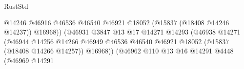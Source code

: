 \begin{lexlean}{RustStd}
\begin{coremodule}
{\begin{coremodule}
{{{{{{{{{{{{{{{{{{{{{{{{{{{{{{{{{{{{{{{{{{{{{{{{{{{{{{{{{{{{                                                                    @14246
                                                                    @46916
                                                                    @46536
                                                                    @46540
                                                                    @46921
                                                                    @18052
                                                                    (@15837 (@18408 @14246 @14237))
                                                                    @16968))
                                                                (@46931
                                                                  @3847
                                                                  @13
                                                                  @17
                                                                  @14271
                                                                  @14293
                                                                  (@46938
                                                                    @14271
                                                                    (@46944
                                                                      @14256
                                                                      @14266
                                                                      @46949
                                                                      @46536
                                                                      @46540
                                                                      @46921
                                                                      @18052
                                                                      (@15837
                                                                        (@18408 @14266 @14257))
                                                                      @16968))
                                                                  (@46962
                                                                    @110
                                                                    @13
                                                                    @16
                                                                    @14291
                                                                    @4448
                                                                    (@46969
                                                                      @14291
}}}}}}}}}}}}}}}}}}}}}}}}}}}}}}}}}}}}}}}}}}}}}}}}}}}}}}}}}}}}
\end{coremodule}}
\end{coremodule}
\end{lexlean}

